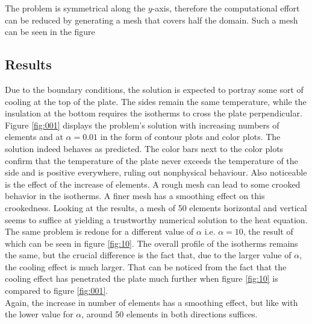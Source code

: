 \documentclass[10pt,a4paper]{article}
\begin{document}
The problem is symmetrical along the $y$-axis, therefore the computational effort can be reduced by generating a mesh that covers half the domain. Such a mesh can be seen in the figure %
\subsection{Results}
Due to the boundary conditions, the solution is expected to portray some sort of cooling at the top of the plate. The sides remain the same temperature, while the insulation at the bottom requires the isotherms to cross the plate perpendicular. \\


Figure \ref{fig:001} displays the problem's solution with increasing numbers of elements and at $\alpha = 0.01$ in the form of contour plots and color plots. The solution indeed behaves as predicted. The color bars next to the color plots confirm that the temperature of the plate never exceeds the temperature of the side and is positive everywhere, ruling out nonphysical behaviour.   Also noticeable is the effect of the increase of elements. A rough mesh can lead to some crooked behavior in the isotherms. A finer mesh has a smoothing effect on this crookedness. Looking at the results, a mesh of 50 elements horizontal and vertical seems to suffice at yielding a trustworthy numerical solution to the heat equation.\\

The same problem is redone for a different value of $\alpha$ i.e. $\alpha = 10$, the result of which can be seen in figure \ref{fig:10}. The overall profile of the isotherms remains the same, but the crucial difference is the fact that, due to the larger value of $\alpha$, the cooling effect is much larger. That can be noticed from the fact that the cooling effect has penetrated the plate much further when figure \ref{fig:10} is compared to figure \ref{fig:001}.\\
Again, the increase in number of elements has a smoothing effect, but like with the lower value for $\alpha$, around 50 elements in both directions suffices.
\end{document}
